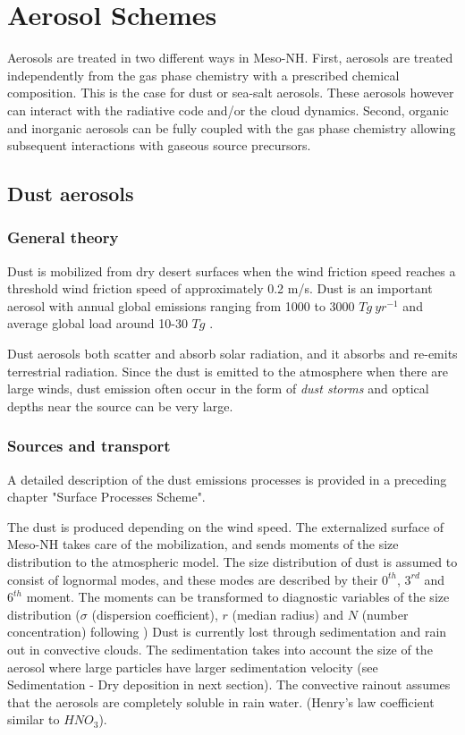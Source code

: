 \chapter{Aerosol Schemes}
%
%
\minitoc
Aerosols are treated in two different ways in Meso-NH. 
First, aerosols are treated independently from 
the gas phase chemistry with a prescribed chemical composition. This is the 
case for dust or sea-salt aerosols. 
These aerosols however can interact with the radiative code and/or the cloud 
dynamics. Second, organic and inorganic aerosols can be fully coupled with the
gas phase chemistry allowing subsequent interactions with gaseous 
source precursors. 
\section{Dust aerosols}
\subsection{General theory}

Dust is mobilized from dry desert surfaces when the wind friction 
speed reaches a threshold wind friction speed of approximately
0.2 m/s. Dust is an important aerosol with annual global
 emissions ranging from 1000 to 3000 $Tg~yr^{-1}$ and average global
load around 10-30 $Tg$ \citep{Zender2004}.

Dust aerosols both scatter and absorb solar radiation, and it absorbs and
re-emits terrestrial radiation. Since the dust is emitted to the atmosphere
when there are large winds, dust emission often occur in the form of
{\it dust storms} and optical depths near the source can be very large.

\subsection{Sources and transport}

A detailed description of the dust emissions processes is provided in a 
preceding chapter "Surface Processes Scheme".

The dust is produced depending on the wind speed. 
The externalized surface
of Meso-NH takes care of the mobilization, and sends moments of the size 
distribution
to the atmospheric model. The size distribution of dust is assumed to consist
of lognormal modes, and these modes are described by their $0^{th}$, $3^{rd}$ 
and
$6^{th}$ moment. The moments can be transformed to diagnostic variables of 
the size distribution ($\sigma$ (dispersion coefficient), $r$ (median radius) 
and $N$ (number concentration) following \citet{Tulet2005})
Dust is currently lost through sedimentation and rain out in convective clouds.
The sedimentation takes into account the size of the aerosol where large 
particles have larger sedimentation velocity 
(see Sedimentation - Dry deposition in next section).
The convective rainout assumes that the 
aerosols are completely soluble in rain water. 
(Henry's law coefficient similar to $HNO_3$).

